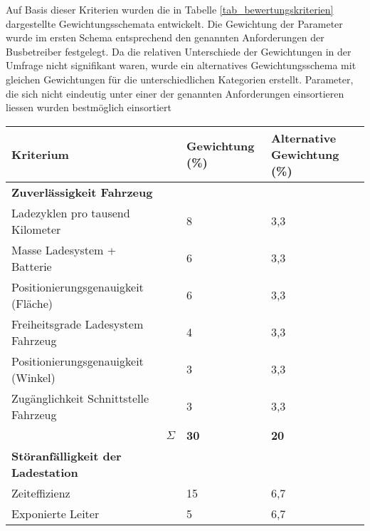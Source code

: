 Auf Basis dieser Kriterien wurden die in Tabelle \ref{tab_bewertungskriterien} dargestellte Gewichtungsschemata entwickelt. Die Gewichtung der Parameter wurde im ersten Schema entsprechend den genannten Anforderungen der Busbetreiber festgelegt. Da die relativen Unterschiede der Gewichtungen in der Umfrage nicht signifikant waren, wurde ein alternatives Gewichtungsschema mit gleichen Gewichtungen für die unterschiedlichen Kategorien erstellt. Parameter, die sich nicht eindeutig unter einer der genannten Anforderungen einsortieren liessen wurden bestmöglich einsortiert
\begin{table}
	\centering
	\begin{tabulary}{\linewidth}{LRLL}
		\toprule
		Kriterium                                                &                   & Gewichtung (\%) & Alternative Gewichtung (\%) \\ \midrule
		\textbf{Zuverlässigkeit Fahrzeug}                        &                   &                 &  \\
		Ladezyklen pro tausend Kilometer                         &                   & 8               & 3,3                         \\
		Masse Ladesystem + Batterie                              &                   & 6               & 3,3                         \\
		Positionierungsgenauigkeit (Fläche)                      &                   & 6               & 3,3                         \\
		Freiheitsgrade Ladesystem Fahrzeug                       &                   & 4               & 3,3                         \\
		Positionierungsgenauigkeit (Winkel)                      &                   & 3               & 3,3                         \\
		Zugänglichkeit Schnittstelle Fahrzeug                    &                   & 3               & 3,3                         \\ \midrule
		                                                         &          $\Sigma$ & \textbf{30}     & \textbf{20}                 \\
		\textbf{Störanfälligkeit der Ladestation}                &                   &                 &  \\
		Zeiteffizienz                                            &                   & 15              & 6,7                         \\
		Exponierte Leiter                                        &                   & 5               & 6,7                         \\

\end{tabulary}
\end{table}
